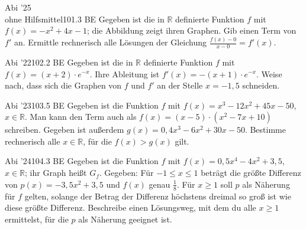 \documentclass[11pt]{article}
\begin{document}
\begin{pfaufg}{Abi ’25\\ohne Hilfsmittel}{101.}{3 BE}
Gegeben ist die in $\mathbb{R}$ definierte Funktion $f$ mit $f(x) = -x^2 + 4x - 1$; die Abbildung zeigt ihren Graphen. Gib einen Term von $f'$ an. Ermittle rechnerisch alle Lösungen der Gleichung $\tfrac{f(x) - 0}{x - 0} = f'(x)$.
\par\smallskip\noindent {}\par
{}
\end{pfaufg}
\pfgruppe{}
\begin{pfaufg}{Abi ’22}{102.}{2 BE}
Gegeben ist die in $\mathbb{R}$ definierte Funktion $f$ mit $f(x) = (x + 2)\cdot e^{-x}$. Ihre Ableitung ist $f'(x) = -(x + 1)\cdot e^{-x}$. Weise nach, dass sich die Graphen von $f$ und $f'$ an der Stelle $x = -1{,}5$ schneiden.
\end{pfaufg}
\pfgruppe{}
\begin{pfaufg}{Abi ’23}{103.}{5 BE}
Gegeben ist die Funktion $f$ mit $f(x) = x^3 - 12x^2 + 45x - 50$, $x \in \mathbb{R}$. Man kann den Term auch als $f(x) = (x - 5)\cdot(x^2 - 7x + 10)$ schreiben. Gegeben ist außerdem $g(x) = 0{,}4x^3 - 6x^2 + 30x - 50$. Bestimme rechnerisch alle $x \in \mathbb{R}$, für die $f(x) > g(x)$ gilt.
\end{pfaufg}
\pfgruppe{}
\begin{pfaufg}{Abi ’24}{104.}{3 BE}
Gegeben ist die Funktion $f$ mit $f(x) = 0{,}5x^4 - 4x^2 + 3{,}5$, $x \in \mathbb{R}$; ihr Graph heißt $G_f$. Gegeben: Für $-1 \le x \le 1$ beträgt die größte Differenz von $p(x) = -3{,}5x^2 + 3{,}5$ und $f(x)$ genau $\tfrac{1}{8}$. Für $x \ge 1$ soll $p$ als Näherung für $f$ gelten, solange der Betrag der Differenz höchstens dreimal so groß ist wie diese größte Differenz. Beschreibe einen Lösungsweg, mit dem du alle $x \ge 1$ ermittelst, für die $p$ als Näherung geeignet ist.
\end{pfaufg}
\end{document}
